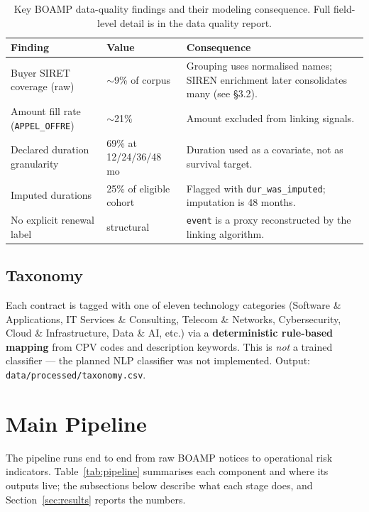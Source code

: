 \documentclass[11pt,a4paper]{article}
\begin{document}
\begin{table}[H]
\centering
\caption{Key BOAMP data-quality findings and their modeling consequence.
Full field-level detail is in the data quality report.}
\label{tab:dq}
\small
\begin{tabular}{@{}p{4.8cm}p{2.8cm}p{6.0cm}@{}}
\toprule
\textbf{Finding} & \textbf{Value} & \textbf{Consequence} \\
\midrule
Buyer SIRET coverage (raw) & $\sim$9\% of corpus & Grouping uses normalised names; SIREN enrichment later consolidates many (see \S3.2). \\
Amount fill rate (\texttt{APPEL\_OFFRE}) & $\sim$21\% & Amount excluded from linking signals. \\
Declared duration granularity & 69\% at 12/24/36/48 mo & Duration used as a covariate, not as survival target. \\
Imputed durations & 25\% of eligible cohort & Flagged with \texttt{dur\_was\_imputed}; imputation is 48 months. \\
No explicit renewal label & structural & \texttt{event} is a proxy reconstructed by the linking algorithm. \\
\bottomrule
\end{tabular}
\end{table}

\subsection{Taxonomy}
Each contract is tagged with one of eleven technology categories (Software \&
Applications, IT Services \& Consulting, Telecom \& Networks, Cybersecurity,
Cloud \& Infrastructure, Data \& AI, etc.) via a \textbf{deterministic
rule-based mapping} from CPV codes and description keywords. This is \emph{not}
a trained classifier --- the planned NLP classifier was not implemented.
Output: \nolinkurl{data/processed/taxonomy.csv}.

\section{Main Pipeline}
\label{sec:pipeline}

The pipeline runs end to end from raw BOAMP notices to operational risk
indicators. Table~\ref{tab:pipeline} summarises each component and where its
outputs live; the subsections below describe what each stage does, and
Section~\ref{sec:results} reports the numbers.
\end{document}
